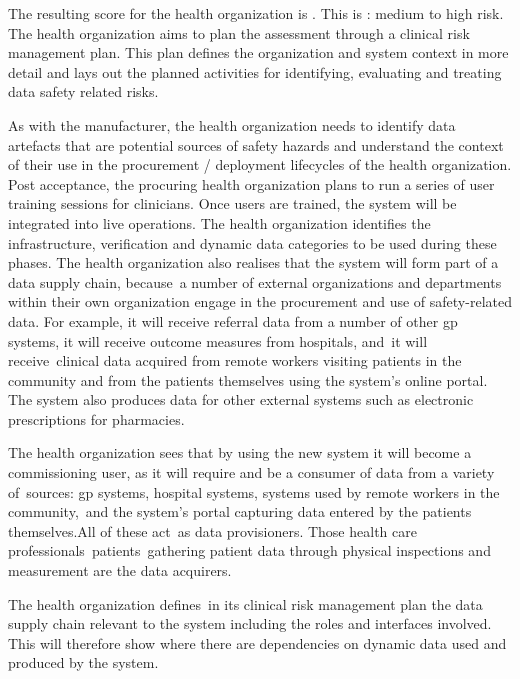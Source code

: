 The resulting score for the health organization is . This is : medium to high risk.
The health organization aims to plan the assessment through a clinical risk management plan. This plan defines the organization and system context in more detail and lays out the planned activities for identifying, evaluating and treating data safety related risks.

As with the manufacturer, the health organization needs to identify \glspl{data artefact} that are potential sources of safety hazards and understand the context of their use in the procurement / deployment lifecycles of the health organization.
Post acceptance, the procuring health organization plans to run a series of user training sessions for clinicians.
Once users are trained, the system will be integrated into live operations.
The health organization identifies the infrastructure,
\gls{verification} and dynamic data categories to be used
during these phases.
The health organization also realises that the system will form part of a data supply chain\cbstart, because\cbend\ a number of external organizations and departments within their own organization engage in the procurement and use of safety-related data.
For example, it will receive referral data from a number of other \gls{gp} systems, it will receive outcome measures from hospitals, and\cbstart\ it will receive\cbend\ clinical data acquired from remote workers visiting patients in the community and from the patients themselves using the system's online portal.
The system also produces data for other external systems such as electronic prescriptions for pharmacies.

The health organization sees that by using the new system it will become a commissioning user, as it will require and be a consumer of data from a variety of\cbstart\ sources: \gls{gp} systems, hospital systems, systems used by remote workers in the community,\cbend\ and the system's portal capturing data entered by the patients themselves.\cbstart All of these act\cbend\ as data provisioners. Those health care professionals\cbstart\ patients\cbend\ gathering patient data through physical inspections and measurement are the data acquirers.

The health organization defines\cbstart\ in its clinical risk management plan the data supply chain relevant to the system including the roles and interfaces involved\cbend. This will therefore show where there are dependencies on dynamic data used and produced by the system.

